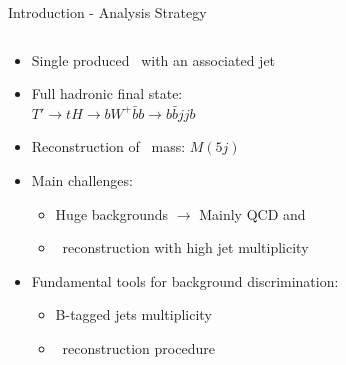\begin{frame}{Introduction - Analysis Strategy}
\vspace{-.2cm}
\begin{columns}

\begin{column}{.50\textwidth}
\begin{block}{}
\begin{itemize}\scriptsize
\item Single produced \Tp~with an associated jet
\item Full hadronic final state: \\ $T'\to t H \to b W^{+} \bar{b} b \to b \bar{b} j j b$
\item Reconstruction of \Tp~mass: $M(5j)$
\item Main challenges:
  \begin{itemize}\scriptsize
  \item Huge backgrounds $\rightarrow$ Mainly QCD and \ttbar
  \item \Tp~reconstruction with high jet multiplicity
  \end{itemize}
\item Fundamental tools for background discrimination:
  \begin{itemize}\scriptsize
  \item B-tagged jets multiplicity
  \item \Tp~reconstruction procedure
  \end{itemize}
\end{itemize}
\end{block}
\end{column}


\end{columns}
\end{frame}
